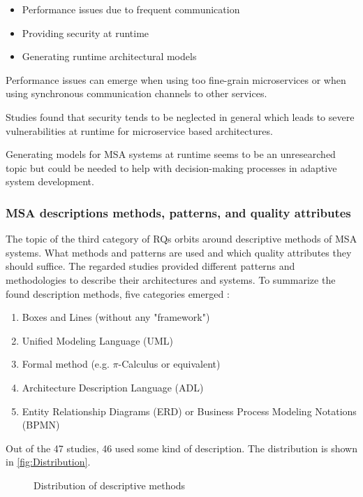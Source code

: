 \begin{itemize}
    \item Performance issues due to frequent communication
    \item Providing security at runtime
    \item Generating runtime architectural models
\end{itemize}

Performance issues can emerge when using too fine-grain microservices
or when using synchronous communication channels to other services.

Studies found that security tends to be neglected in general which leads
to severe vulnerabilities at runtime for microservice based architectures.

Generating models for MSA systems at runtime seems to be an unresearched
topic but could be needed to help with decision-making processes in
adaptive system development.

\subsubsection{MSA descriptions methods, patterns, and quality attributes}

The topic of the third category of RQs orbits around descriptive methods
of MSA systems. What methods and patterns are used and which
quality attributes they should suffice. The regarded studies provided
different patterns and methodologies to describe their architectures
and systems. To summarize the found description methods, five categories
emerged \cite{waseem:SMSMSADevOps}:

\begin{enumerate}
    \item Boxes and Lines (without any "framework")
    \item Unified Modeling Language (UML)
    \item Formal method (e.g. $\pi$-Calculus or equivalent)
    \item Architecture Description Language (ADL)
    \item Entity Relationship Diagrams (ERD) or Business
          Process Modeling Notations (BPMN)
\end{enumerate}

Out of the 47 studies, 46 used some kind of description.
The distribution is shown in \autoref{fig:Distribution}.

\begin{figure}[ht]
    \caption{Distribution of descriptive methods}
    \label{fig:Distribution}
\end{figure}

